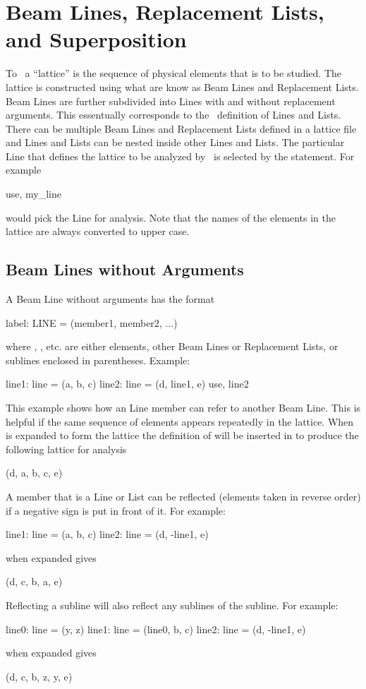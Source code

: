 \chapter{Beam Lines, Replacement Lists, and Superposition}

To \bmad\ a ``lattice'' is the sequence of physical elements that is to be studied.
The lattice is constructed using what are know as Beam Lines and Replacement Lists.
Beam Lines are further subdivided into Lines with and
without replacement arguments. This
essentually corresponds to the \mad\ definition of Lines and Lists. There can be multiple Beam
Lines and Replacement Lists defined in a lattice file and Lines and Lists can be
nested inside other Lines and Lists. The particular Line that defines
the lattice to be analyzed by \bmad\ is selected by the  statement. For example
\begin{example}
  use, my_line
\end{example}
would pick the Line  for analysis. Note that the names of the elements in the
lattice are always converted to upper case.

\section{Beam Lines without Arguments}
A Beam Line without arguments has the format
\begin{example}
  label: LINE = (member1, member2, ...)
\end{example}
where , , etc. are either elements, other Beam Lines or 
Replacement Lists, or sublines enclosed in parentheses.
Example:
\begin{example}
  line1: line = (a, b, c)
  line2: line = (d, line1, e)
  use, line2
\end{example}
This example shows how an Line member can refer to another Beam Line.
This is helpful if the same sequence of elements appears repeatedly in the lattice.
When  is expanded to form the lattice the definition of 
will be inserted 
in to produce the following lattice for analysis
\begin{example}
  (d, a, b, c, e)
\end{example}

A member that is a Line or List can be reflected (elements taken in reverse order) if
a negative sign is put in front of it. For example:
\begin{example}
  line1: line = (a, b, c)
  line2: line = (d, -line1, e)
\end{example}
 when expanded gives
\begin{example}
  (d, c, b, a, e)
\end{example}
Reflecting a subline will also reflect any sublines of the subline. For example:
\begin{example}
  line0: line = (y, z)
  line1: line = (line0, b, c)
  line2: line = (d, -line1, e)
\end{example}
 when expanded gives
\begin{example}
  (d, c, b, z, y, e)
\end{example}

